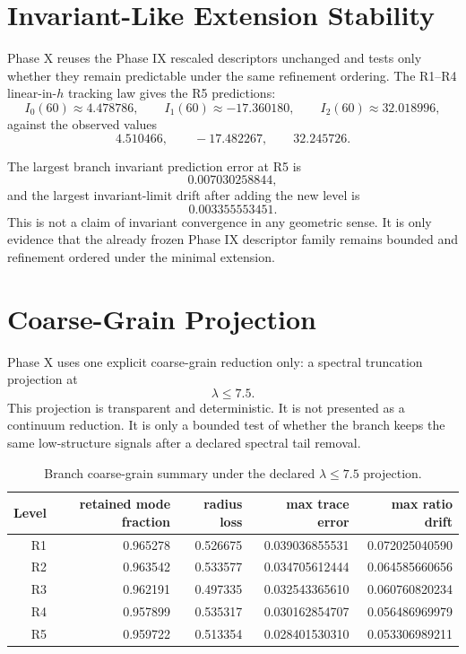 \documentclass[11pt]{article}
\begin{document}
\section{Invariant-Like Extension Stability}

Phase X reuses the Phase IX rescaled descriptors unchanged and tests only whether they remain predictable under the same refinement ordering. The R1--R4 linear-in-$h$ tracking law gives the R5 predictions:
\[
I_0(60) \approx 4.478786,\qquad
I_1(60) \approx -17.360180,\qquad
I_2(60) \approx 32.018996,
\]
against the observed values
\[
4.510466,\qquad -17.482267,\qquad 32.245726.
\]

The largest branch invariant prediction error at R5 is
\[
0.007030258844,
\]
and the largest invariant-limit drift after adding the new level is
\[
0.003355553451.
\]
This is not a claim of invariant convergence in any geometric sense. It is only evidence that the already frozen Phase IX descriptor family remains bounded and refinement ordered under the minimal extension.

\section{Coarse-Grain Projection}

Phase X uses one explicit coarse-grain reduction only: a spectral truncation projection at
\[
\lambda \le 7.5.
\]
This projection is transparent and deterministic. It is not presented as a continuum reduction. It is only a bounded test of whether the branch keeps the same low-structure signals after a declared spectral tail removal.

\begin{table}[t]
\centering
\small
\begin{tabular}{@{}rrrrr@{}}
\toprule
Level & retained mode fraction & radius loss & max trace error & max ratio drift \\
\midrule
R1 & 0.965278 & 0.526675 & 0.039036855531 & 0.072025040590 \\
R2 & 0.963542 & 0.533577 & 0.034705612444 & 0.064585660656 \\
R3 & 0.962191 & 0.497335 & 0.032543365610 & 0.060760820234 \\
R4 & 0.957899 & 0.535317 & 0.030162854707 & 0.056486969979 \\
R5 & 0.959722 & 0.513354 & 0.028401530310 & 0.053306989211 \\
\bottomrule
\end{tabular}
\caption{Branch coarse-grain summary under the declared $\lambda \le 7.5$ projection.}
\label{tab:coarse}
\end{table}
\end{document}
